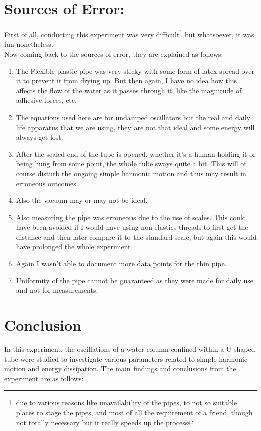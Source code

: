 \documentclass[twocolumn,11pt]{article}
\begin{document}
\section{Sources of Error:}
First of all, conducting this experiment was very difficult\footnote{due to various reasons like unavailability of the pipes, to not so suitable places to stage the pipes, and most of all the requirement of a friend, though not totally necessary but it really speeds up the process} but whatsoever, it was fun nonetheless. 
\\
Now coming back to the sources of error, they are explained as follows:
\begin{enumerate}
    \item The Flexible plastic pipe was very sticky with some form of latex spread over it to prevent it from drying up. But then again, I have no idea how this affects the flow of the water as it passes through it, like the magnitude of adhesive forces, etc.
    \item The equations used here are for undamped oscillators but the real and daily life apparatus that we are using, they are not that ideal and some energy will always get lost.
    \item After the sealed end of the tube is opened, whether it's a human holding it or being hung from some point, the whole tube sways quite a bit. This will of course disturb the ongoing simple harmonic motion and thus may result in erroneous outcomes.
    \item Also the vacuum may or may not be ideal.
    \item Also measuring the pipe was erroneous due to the use of scales. This could have been avoided if I would have using non-elastics threads to first get the distance and then later compare it to the standard scale, but again this would have prolonged the whole experiment.
    \item Again I wasn't able to document more data points for the thin pipe.
    \item Uniformity of the pipe cannot be guaranteed as they were made for daily use and not for measurements.

\end{enumerate}

\section{Conclusion}


In this experiment, the oscillations of a water column confined within a U-shaped tube were studied to investigate various parameters related to simple harmonic motion and energy dissipation. The main findings and conclusions from the experiment are as follows:
\end{document}
